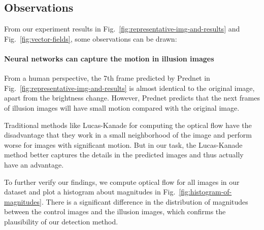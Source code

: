 \documentclass[journal]{IEEEtran}
\begin{document}
  \subsection{Observations}
  
  From our experiment results in Fig.~\ref{fig:representative-img-and-results} and Fig.~\ref{fig:vector-fields}, some observations can be drawn:
  
  \paragraph{Neural networks can capture the motion in illusion images} From a human perspective, the 7th frame predicted by Prednet in Fig.~\ref{fig:representative-img-and-results} is almost identical to the original image, apart from the brightness change. However, Prednet predicts that the next frames of illusion images will have small motion compared with the original image.
  
  Traditional methods like Lucas-Kanade for computing the optical flow have the disadvantage that they work in a small neighborhood of the image and perform worse for images with significant motion. But in our task, the Lucas-Kanade method better captures the details in the predicted images and thus actually have an advantage.
  
  To further verify our findings, we compute optical flow for all images in our dataset and plot a histogram about magnitudes in Fig.~\ref{fig:histogram-of-magnitudes}. There is a significant difference in the distribution of magnitudes between the control images and the illusion images, which confirms the plausibility of our detection method.
  
\end{document}

